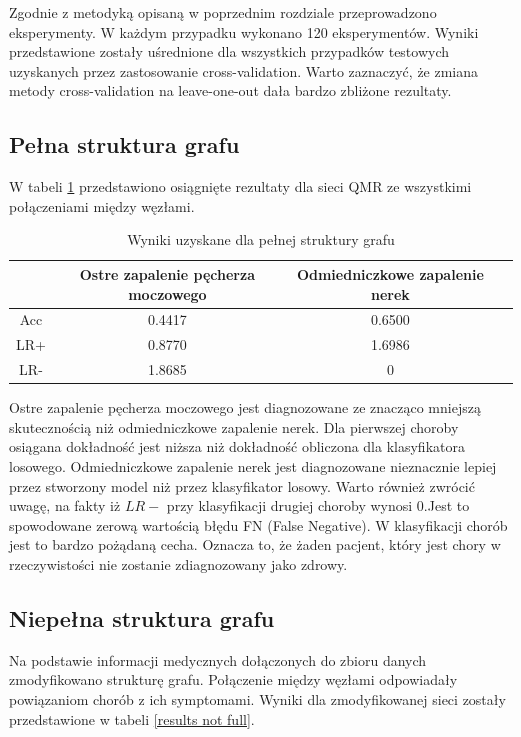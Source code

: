 \documentclass[12pt]{article}
\begin{document}
Zgodnie z metodyką opisaną w poprzednim rozdziale przeprowadzono eksperymenty. W każdym przypadku wykonano 120 eksperymentów. Wyniki przedstawione zostały uśrednione dla wszystkich przypadków testowych uzyskanych przez zastosowanie cross-validation. Warto zaznaczyć, że zmiana metody cross-validation na leave-one-out dała bardzo zbliżone rezultaty.

\subsection{Pełna struktura grafu}

W tabeli \ref{results full} przedstawiono osiągnięte rezultaty dla sieci QMR ze wszystkimi połączeniami między węzłami.

\begin{table}[H]
\caption{Wyniki uzyskane dla pełnej struktury grafu}
\label{results full}
\centering
\begin{tabular}{|c|c|c|c|}
  \hline 
   & Ostre zapalenie pęcherza moczowego & Odmiedniczkowe zapalenie nerek \\
  \hline
  Acc & 0.4417 & 0.6500 \\
  \hline
  LR+ & 0.8770 & 1.6986 \\
  \hline
  LR- & 1.8685 & 0 \\
  \hline
\end{tabular}
\end{table}

Ostre zapalenie pęcherza moczowego jest diagnozowane ze znacząco mniejszą skutecznością niż odmiedniczkowe zapalenie nerek. Dla pierwszej choroby osiągana dokładność jest niższa niż dokładność obliczona dla klasyfikatora losowego. Odmiedniczkowe zapalenie nerek jest diagnozowane nieznacznie lepiej przez stworzony model niż przez klasyfikator losowy. Warto również zwrócić uwagę, na fakty iż $LR-$ przy klasyfikacji drugiej choroby wynosi 0.Jest to spowodowane zerową wartością błędu FN (False Negative). W klasyfikacji chorób jest to bardzo pożądaną cecha. Oznacza to, że żaden pacjent, który jest chory w rzeczywistości nie zostanie zdiagnozowany jako zdrowy.

\subsection{Niepełna struktura grafu}

Na podstawie informacji medycznych dołączonych do zbioru danych zmodyfikowano strukturę grafu. Połączenie między węzłami odpowiadały powiązaniom chorób z ich symptomami. Wyniki dla zmodyfikowanej sieci zostały przedstawione w tabeli \ref{results not full}.
\end{document}
